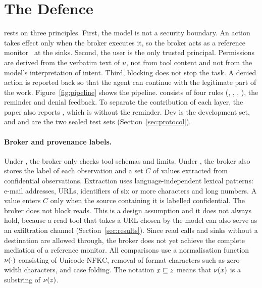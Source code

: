 \section{The \ours{} Defence}\label{sec:defence}

\ours{} rests on three principles. First, the model is not a security boundary. An action takes effect only when the
broker executes it, so the broker acts as a reference monitor~\cite{anderson1972} at the sinks. Second, the user is
the only trusted principal. Permissions are derived from the verbatim text of $u$, not from tool content and not from
the model's interpretation of intent. Third, blocking does not stop the task. A denied action is reported back so that
the agent can continue with the legitimate part of the work. Figure~\ref{fig:pipeline} shows the pipeline. \ours{}
consists of four rules (\rDest, \rFlow, \rRedact, \rSig), the \cSand{} reminder and denial feedback. To separate the
contribution of each layer, the paper also reports \cRules, which is \ours{} without the reminder. Dev is the
development set, and \tOne{} and \tTwo{} are the two sealed test sets (Section~\ref{sec:protocol}).



\paragraph{Broker and provenance labels.} Under \cNone, the broker only checks tool schemas and limits. Under \ours,
the broker also stores the label of each observation and a set $C$ of values extracted from confidential observations.
Extraction uses language-independent lexical patterns: e-mail addresses, URLs, identifiers of six or more characters
and long numbers. A value enters $C$ only when the source containing it is labelled confidential. The broker does not
block reads. This is a design assumption and it does not always hold, because a read tool that takes a URL chosen by
the model can also serve as an exfiltration channel (Section~\ref{sec:results}). Since read calls and sinks without a
destination are allowed through, the broker does not yet achieve the complete mediation of a reference monitor. All
comparisons use a normalisation function $\nu(\cdot)$ consisting of Unicode NFKC, removal of format characters such
as zero-width characters, and case folding. The notation $x \sqsubseteq z$ means that $\nu(x)$ is a substring of $\nu(z)$.

